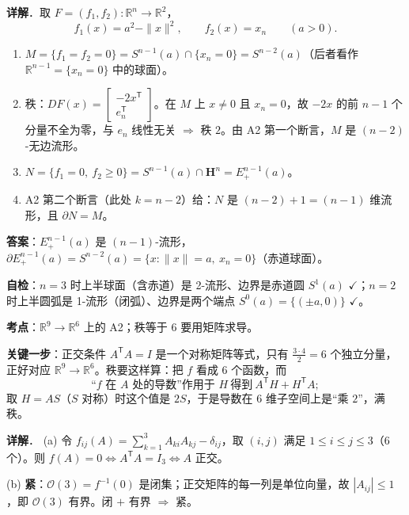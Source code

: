 \documentclass[11pt]{ctexart}
\renewcommand{\qbreak}{\needspace{0.22\textheight}}
\newcommand{\HH}{\mathbf{H}}
\begin{document}
\textbf{详解}．取 $F=(f_1,f_2):\mathbb{R}^n\to\mathbb{R}^2$，
\[ f_1(x)=a^2-\|x\|^2,\qquad f_2(x)=x_n\qquad(a>0). \]
\begin{enumerate}
  \item $M=\{f_1=f_2=0\}=S^{n-1}(a)\cap\{x_n=0\}=S^{n-2}(a)$（后者看作 $\mathbb{R}^{n-1}=\{x_n=0\}$ 中的球面）。
  \item 秩：$DF(x)=\begin{bmatrix}-2x^{\mathsf T}\\ e_n^{\mathsf T}\end{bmatrix}$。在 $M$ 上 $x\ne0$ 且 $x_n=0$，故 $-2x$ 的前 $n-1$ 个分量不全为零，与 $e_n$ 线性无关 $\Rightarrow$ 秩 $2$。由 A2 第一个断言，$M$ 是 $(n-2)$-无边流形。
  \item $N=\{f_1=0,\ f_2\ge0\}=S^{n-1}(a)\cap\HH^n=E^{n-1}_+(a)$。
  \item A2 第二个断言（此处 $k=n-2$）给：$N$ 是 $(n-2)+1=(n-1)$ 维流形，且 $\partial N=M$。
\end{enumerate}

\textbf{答案}：$E^{n-1}_+(a)$ 是 $(n-1)$-流形，$\partial E^{n-1}_+(a)=S^{n-2}(a)=\{x:\|x\|=a,\ x_n=0\}$（赤道球面）。

\textbf{自检}：$n=3$ 时上半球面（含赤道）是 2-流形、边界是赤道圆 $S^1(a)$ $\checkmark$；$n=2$ 时上半圆弧是 1-流形（闭弧）、边界是两个端点 $S^0(a)=\{(\pm a,0)\}$ $\checkmark$。

\qbreak
{}\label{ax5}

\textbf{考点}：$\mathbb{R}^9\to\mathbb{R}^6$ 上的 A2；秩等于 $6$ 要用矩阵求导。

\textbf{关键一步}：正交条件 $A^{\mathsf T}A=I$ 是一个对称矩阵等式，只有 $\frac{3\cdot4}{2}=6$ 个独立分量，正好对应 $\mathbb{R}^9\to\mathbb{R}^6$。秩要这样算：把 $f$ 看成 6 个函数，而
\[ \text{“}f\text{ 在 }A\text{ 处的导数”作用于 }H\ \text{得到}\ A^{\mathsf T}H+H^{\mathsf T}A; \]
取 $H=AS$（$S$ 对称）时这个值是 $2S$，于是导数在 6 维子空间上是“乘 $2$”，满秩。

\textbf{详解}．
(a) 令 $f_{ij}(A)=\sum_{k=1}^{3}A_{ki}A_{kj}-\delta_{ij}$，取 $(i,j)$ 满足 $1\le i\le j\le3$（6 个）。则 $f(A)=0\iff A^{\mathsf T}A=I_3\iff A$ 正交。

(b) \textbf{紧}：$\mathcal{O}(3)=f^{-1}(0)$ 是闭集；正交矩阵的每一列是单位向量，故 $|A_{ij}|\le1$，即 $\mathcal{O}(3)$ 有界。闭 $+$ 有界 $\Rightarrow$ 紧。
\end{document}
